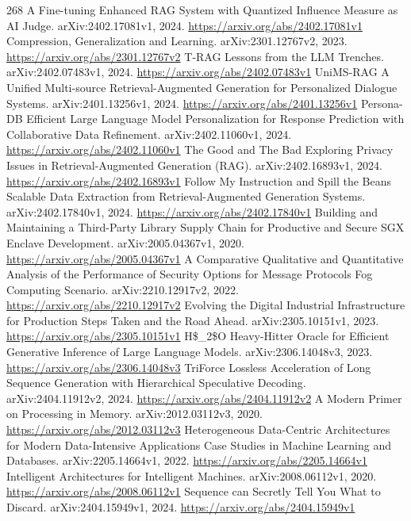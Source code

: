 \documentclass[11pt]{article}
\begin{document}
\begin{thebibliography}{268}
 A Fine-tuning Enhanced RAG System with Quantized Influence Measure as AI Judge. arXiv:2402.17081v1, 2024. \url{https://arxiv.org/abs/2402.17081v1}
 Compression, Generalization and Learning. arXiv:2301.12767v2, 2023. \url{https://arxiv.org/abs/2301.12767v2}
 T-RAG Lessons from the LLM Trenches. arXiv:2402.07483v1, 2024. \url{https://arxiv.org/abs/2402.07483v1}
 UniMS-RAG A Unified Multi-source Retrieval-Augmented Generation for Personalized Dialogue Systems. arXiv:2401.13256v1, 2024. \url{https://arxiv.org/abs/2401.13256v1}
 Persona-DB Efficient Large Language Model Personalization for Response Prediction with Collaborative Data Refinement. arXiv:2402.11060v1, 2024. \url{https://arxiv.org/abs/2402.11060v1}
 The Good and The Bad Exploring Privacy Issues in Retrieval-Augmented Generation (RAG). arXiv:2402.16893v1, 2024. \url{https://arxiv.org/abs/2402.16893v1}
 Follow My Instruction and Spill the Beans Scalable Data Extraction from Retrieval-Augmented Generation Systems. arXiv:2402.17840v1, 2024. \url{https://arxiv.org/abs/2402.17840v1}
 Building and Maintaining a Third-Party Library Supply Chain for Productive and Secure SGX Enclave Development. arXiv:2005.04367v1, 2020. \url{https://arxiv.org/abs/2005.04367v1}
 A Comparative Qualitative and Quantitative Analysis of the Performance of Security Options for Message Protocols Fog Computing Scenario. arXiv:2210.12917v2, 2022. \url{https://arxiv.org/abs/2210.12917v2}
 Evolving the Digital Industrial Infrastructure for Production Steps Taken and the Road Ahead. arXiv:2305.10151v1, 2023. \url{https://arxiv.org/abs/2305.10151v1}
 H\$\_2\$O Heavy-Hitter Oracle for Efficient Generative Inference of Large Language Models. arXiv:2306.14048v3, 2023. \url{https://arxiv.org/abs/2306.14048v3}
 TriForce Lossless Acceleration of Long Sequence Generation with Hierarchical Speculative Decoding. arXiv:2404.11912v2, 2024. \url{https://arxiv.org/abs/2404.11912v2}
 A Modern Primer on Processing in Memory. arXiv:2012.03112v3, 2020. \url{https://arxiv.org/abs/2012.03112v3}
 Heterogeneous Data-Centric Architectures for Modern Data-Intensive Applications Case Studies in Machine Learning and Databases. arXiv:2205.14664v1, 2022. \url{https://arxiv.org/abs/2205.14664v1}
 Intelligent Architectures for Intelligent Machines. arXiv:2008.06112v1, 2020. \url{https://arxiv.org/abs/2008.06112v1}
 Sequence can Secretly Tell You What to Discard. arXiv:2404.15949v1, 2024. \url{https://arxiv.org/abs/2404.15949v1}

\end{thebibliography}
\end{document}
